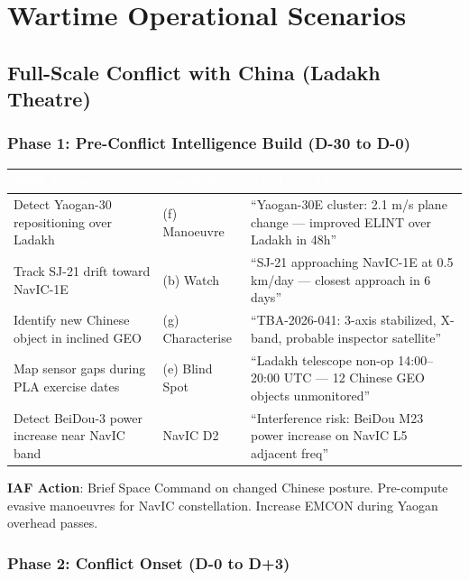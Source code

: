 \documentclass[11pt,a4paper]{article}
\newcommand{\TH}[1]{\textcolor{white}{\textbf{#1}}}
\begin{document}
\newpage
\section{Wartime Operational Scenarios}

\subsection{Full-Scale Conflict with China (Ladakh Theatre)}

\subsubsection{Phase 1: Pre-Conflict Intelligence Build (D-30 to D-0)}

\begin{table}[H]\centering\small
\begin{tabularx}{\textwidth}{|p{4.5cm}|p{2.8cm}|X|}
\hline
\rowcolor{dblue}\TH{SSIS Action} & \TH{Capability} & \TH{Alert to IAF} \\
\hline
Detect Yaogan-30 repositioning over Ladakh & (f) Manoeuvre & ``Yaogan-30E cluster: 2.1 m/s plane change --- improved ELINT over Ladakh in 48h'' \\
\hline
Track SJ-21 drift toward NavIC-1E & (b) Watch & ``SJ-21 approaching NavIC-1E at 0.5 km/day --- closest approach in 6 days'' \\
\hline
Identify new Chinese object in inclined GEO & (g) Characterise & ``TBA-2026-041: 3-axis stabilized, X-band, probable inspector satellite'' \\
\hline
Map sensor gaps during PLA exercise dates & (e) Blind Spot & ``Ladakh telescope non-op 14:00--20:00 UTC --- 12 Chinese GEO objects unmonitored'' \\
\hline
Detect BeiDou-3 power increase near NavIC band & NavIC D2 & ``Interference risk: BeiDou M23 power increase on NavIC L5 adjacent freq'' \\
\hline
\end{tabularx}
\end{table}

\textbf{IAF Action}: Brief Space Command on changed Chinese posture. Pre-compute evasive manoeuvres for NavIC constellation. Increase EMCON during Yaogan overhead passes.

\subsubsection{Phase 2: Conflict Onset (D-0 to D+3)}
\end{document}
